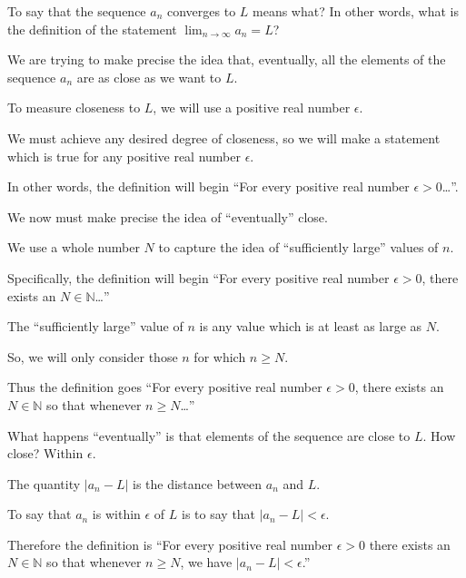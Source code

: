 \documentclass{ximera}
\begin{document}
\begin{question}
  To say that the sequence $a_n$ converges to $L$ means what?  In
  other words, what is the definition of the statement
  $\lim_{n\to\infty} a_n = L$?
  \begin{hint}
    We are trying to make precise the idea that, eventually, all the elements of the sequence $a_n$ are as close as we want to $L$.
  \end{hint}
  \begin{hint}
    To measure closeness to $L$, we will use a positive real number $\epsilon$.
  \end{hint}
  \begin{hint}
    We must achieve any desired degree of closeness, so we will make a statement which is true for any positive real number $\epsilon$.
  \end{hint}
  \begin{hint}
    In other words, the definition will begin ``For every positive real number $\epsilon > 0$\ldots''.
  \end{hint}
  \begin{hint}
    We now must make precise the idea of ``eventually'' close.
  \end{hint}
  \begin{hint}
    We use a whole number $N$ to capture the idea of ``sufficiently large'' values of $n$.
  \end{hint}
  \begin{hint}
    Specifically, the definition will begin ``For every positive real number $\epsilon > 0$, there exists an $N \in \mathbb{N}$\ldots''
  \end{hint}
  \begin{hint}
    The ``sufficiently large'' value of $n$ is any value which is at least as large as $N$.
  \end{hint}
  \begin{hint}
    So, we will only consider those $n$ for which $n \ge N$.
  \end{hint}
    \begin{hint}
      Thus the definition goes ``For every positive real number $\epsilon > 0$, there exists an $N \in \mathbb{N}$ so that whenever $n \ge N$\ldots''
    \end{hint}
    \begin{hint}
      What happens ``eventually'' is that elements of the sequence are close to $L$.  How close?  Within $\epsilon$.
    \end{hint}
    \begin{hint}
      The quantity $|a_n - L|$ is the distance between $a_n$ and $L$.
    \end{hint}
    \begin{hint}
      To say that $a_n$ is within $\epsilon$ of $L$ is to say that $|a_n - L| < \epsilon$.
    \end{hint}
    \begin{hint}
      Therefore the definition is ``For every positive real number $\epsilon > 0$ there exists an $N \in \mathbb{N}$ so that whenever $n \ge N$, we have $ |a_n - L| < \epsilon $.''
    \end{hint}


\end{question}
\end{document}
